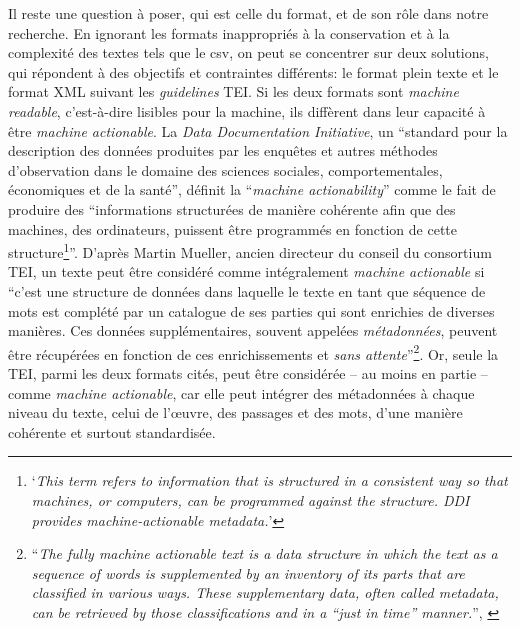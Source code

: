 Il reste une question à poser, qui est celle du format, et de son rôle dans notre recherche. En ignorant les formats inappropriés à la conservation et à la complexité des textes tels que le \acrshort{csv}, on peut se concentrer sur deux solutions, qui répondent à des objectifs et contraintes différents: le format plein texte et le format XML suivant les \textit{guidelines} TEI. Si les deux formats sont \textit{machine readable}, c'est-à-dire lisibles pour la machine, ils diffèrent dans leur capacité à être \textit{machine actionable}. La \textit{Data Documentation Initiative}, un \enquote{standard pour la description des données produites par les enquêtes et autres méthodes d'observation dans le domaine des sciences sociales, comportementales, économiques et de la santé}, définit la \enquote{\textit{machine actionability}} comme le fait de produire des \enquote{informations structurées de manière cohérente afin que des machines, des ordinateurs, puissent être programmés en fonction de cette structure\footnote{\enquote{\textit{This term refers to information that is structured in a consistent way so that machines, or computers, can be programmed against the structure. DDI provides machine-actionable metadata.}}\textcite{noauthor_machine_actionable_nodate}}}. D'après Martin Mueller, ancien directeur du conseil du consortium TEI, un texte peut être considéré comme intégralement \textit{machine actionable} si \enquote{c'est une structure de données dans laquelle le texte en tant que séquence de mots est complété par un catalogue de ses parties qui sont enrichies de diverses manières. Ces données supplémentaires, souvent appelées \textit{métadonnées}, peuvent être récupérées en fonction de ces enrichissements et \textit{sans attente}}\footnote{\enquote{\textit{The fully machine actionable text is a data structure in which the text as a sequence of words is supplemented by an inventory of its parts that are classified in various ways. These supplementary data, often called metadata, can be retrieved by those classifications and in a “just in time” manner.}}, \textcite{mueller_shakespeare_2014}}. Or, seule la TEI, parmi les deux formats cités, peut être considérée -- au moins en partie -- comme \textit{machine actionable}, car elle peut intégrer des métadonnées à chaque niveau du texte, celui de l'œuvre, des passages et des mots, d'une manière cohérente et surtout standardisée.

